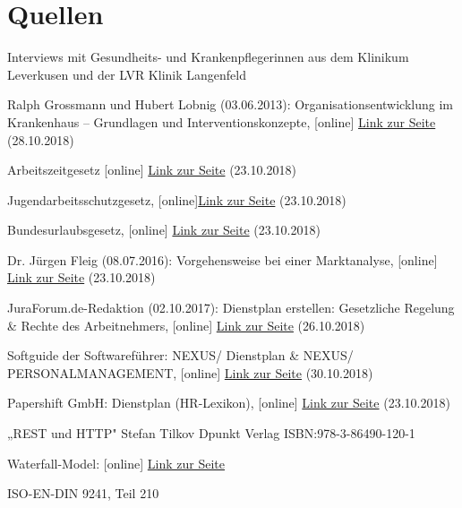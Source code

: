 \documentclass[10pt,a4paper]{article}
\begin{document}
\section{Quellen}
\begin{description}
\item
Interviews mit Gesundheits- und Krankenpflegerinnen aus dem Klinikum Leverkusen und der LVR Klinik Langenfeld
\item
Ralph Grossmann und Hubert Lobnig (03.06.2013): Organisationsentwicklung im Krankenhaus – Grundlagen und Interventionskonzepte, [online] \href{http://www.mwv-berlin.de/buecher-bestellen-2016/images/product_images/leseproben_images/9783954660025_Leseprobe.pdf}{Link zur Seite} (28.10.2018)
\item
Arbeitszeitgesetz [online] \href{https://www.gesetze-im-internet.de/arbzg/BJNR117100994.html}{Link zur Seite} (23.10.2018)
\item
Jugendarbeitsschutzgesetz, [online]\href{https://www.gesetze-im-internet.de/jarbschg/}{Link zur Seite} (23.10.2018)
\item
Bundesurlaubsgesetz, [online] \href{https://www.gesetze-im-internet.de/burlg/}{Link zur Seite} (23.10.2018)
\item
Dr. Jürgen Fleig (08.07.2016): Vorgehensweise bei einer Marktanalyse, [online] \href{https://www.business-wissen.de/hb/vorgehensweise-bei-einer-marktanalyse/}{Link zur Seite} (23.10.2018)
\item
JuraForum.de-Redaktion (02.10.2017): Dienstplan erstellen: Gesetzliche Regelung & Rechte des Arbeitnehmers, [online] \href{https://www.juraforum.de/ratgeber/arbeitsrecht/dienstplan-erstellen-gesetzliche-regelung-und-rechte-des-arbeitnehmers}{Link zur Seite} (26.10.2018)
\item
Softguide der Softwareführer: NEXUS/ Dienstplan & NEXUS/ PERSONALMANAGEMENT, [online] \href{https://www.softguide.de/programm/nexus-dienstplan}{Link zur Seite} (30.10.2018)
\item
Papershift GmbH: Dienstplan (HR-Lexikon), [online] \href{https://www.papershift.com/lexikon/dienstplan}{Link zur Seite} (23.10.2018)
\item
„REST und HTTP" Stefan Tilkov Dpunkt Verlag ISBN:978-3-86490-120-1
\item
Waterfall-Model: [online]
\href{https://upload.wikimedia.org/wikipedia/commons/thumb/e/e2/Waterfall_model.svg/1200px-Waterfall_model.svg.png}{Link zur Seite}
\item
ISO-EN-DIN 9241, Teil 210
\end{description}
\end{document}
